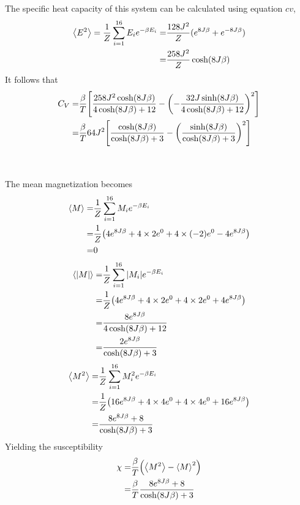 \documentclass[%
reprint,nofootinbib,
amsmath,amssymb,
aps,
]{revtex4-1}
\begin{document}
The specific heat capacity of this system can be calculated using equation $cv$, 
\begin{align}
\expval{E^2} = \dfrac{1}{Z}\sum_{i=1}^{16}E_ie^{-\beta E_i}  = & \dfrac{128J^2}{Z}(e^{8J\beta} + e^{-8J\beta}) \\
=& \dfrac{258J^2}{Z}\cosh(8J\beta)
\end{align}
It follows that 
\begin{align}
C_V =& \dfrac{\beta}{T}\qty[\dfrac{258J^2\cosh(8J\beta)}{4\cosh(8J\beta) + 12 }  -\qty(-\dfrac{32J\sinh(8J\beta)}{4\cosh(8J\beta) + 12 })^2] \nonumber \\
= & \dfrac{\beta}{T}64J^2\qty[\dfrac{\cosh(8J\beta)}{\cosh(8J\beta) + 3}  -\qty(\dfrac{\sinh(8J\beta)}{\cosh(8J\beta) + 3 })^2]\nonumber \\ \nonumber & \\ & 
\end{align}
The mean magnetization becomes 
\begin{align*}
\expval{M} =& \dfrac{1}{Z}\sum_{i = 1}^{16} M_ie^{-\beta E_i} \\ 
= & \dfrac{1}{Z}\qty(4e^{8J\beta} +4\times 2e^0 + 4\times(-2)e^0 -4e^{8J\beta}) \\
= & 0
\end{align*}
\begin{align*}
\expval{\abs{M}} =& \dfrac{1}{Z}\sum_{i = 1}^{16} \abs{M_i}e^{-\beta E_i} \\ 
= & \dfrac{1}{Z}\qty(4e^{8J\beta} +4\times 2e^0 + 4\times2e^0 +4e^{8J\beta}) \\
= & \dfrac{8e^{8J\beta}}{4\cosh(8J\beta) + 12 } \\
= & \dfrac{2e^{8J\beta}}{\cosh(8J\beta) + 3 }
\end{align*}
\begin{align*}
\expval{M^2} =& \dfrac{1}{Z}\sum_{i = 1}^{16} M_i^2e^{-\beta E_i} \\ 
= & \dfrac{1}{Z}\qty(16e^{8J\beta} +4\times 4e^0 + 4\times4e^0 + 16e^{8J\beta}) \\
= & \dfrac{8e^{8J\beta} + 8}{\cosh(8J\beta) + 3}
\end{align*}
Yielding the susceptibility 
\begin{align}
\chi =& \dfrac{\beta}{T}\qty(\expval{M^2}- \expval{M}^2)\\
=& \dfrac{\beta}{T}\dfrac{8e^{8J\beta} + 8}{\cosh(8J\beta) + 3}
\end{align}
\newpage
\end{document}
